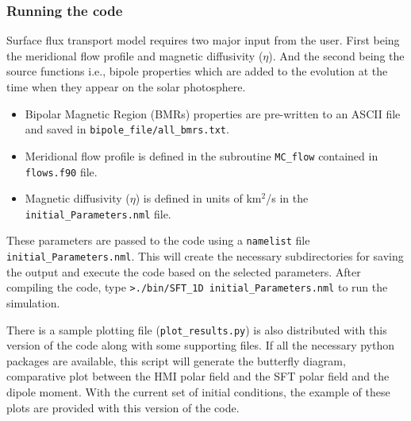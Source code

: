 \subsubsection{Running the code}
Surface flux transport model requires two major input from the user. First being the meridional flow profile and magnetic diffusivity ($\eta$). And the second being the source functions i.e., bipole properties which are added to the evolution at the time when they appear on the solar photosphere. 
\begin{itemize}
    \item Bipolar Magnetic Region (BMRs) properties are pre-written to an ASCII file and saved in \texttt{bipole\_file/all\_bmrs.txt}.
    \item Meridional flow profile is defined in the subroutine \texttt{MC\_flow} contained in \texttt{flows.f90} file. 
    \item Magnetic diffusivity ($\eta$) is defined in units of km$^2$/s in the \texttt{initial\_Parameters.nml} file.
\end{itemize}
These parameters are passed to the code using a \texttt{namelist} file \texttt{initial\_Parameters.nml}. This will create the necessary subdirectories for saving the output and execute the code based on the selected parameters. After compiling the code, type \texttt{>./bin/SFT\_1D initial\_Parameters.nml} to run the simulation.

There is a sample plotting file (\texttt{plot\_results.py}) is also distributed with this version of the code along with some supporting files. If all the necessary python packages are available, this script will generate the butterfly diagram, comparative plot between the HMI polar field and the SFT polar field and the dipole moment. With the current set of initial conditions, the example of these plots are provided with this version of the code. 
